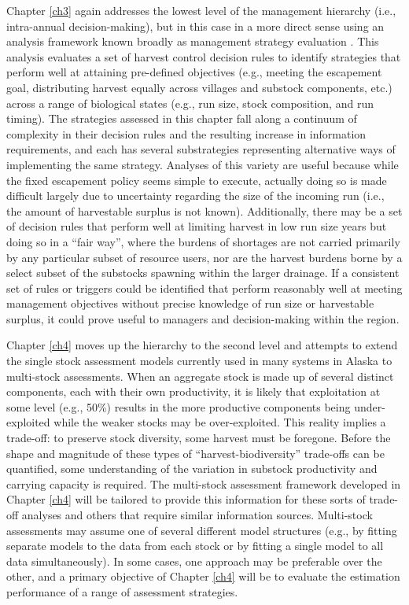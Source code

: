 \documentclass[12pt,]{book}
\theoremstyle{definition}
\theoremstyle{definition}
\theoremstyle{definition}
\theoremstyle{remark}
\begin{document}
Chapter \ref{ch3} again addresses the lowest level of the management
hierarchy (i.e., intra-annual decision-making), but in this case in a
more direct sense using an analysis framework known broadly as
management strategy evaluation \citep[MSE;
e.g.,][]{butterworth-2007, punt-etal-2014}. This analysis evaluates a
set of harvest control decision rules to identify strategies that
perform well at attaining pre-defined objectives (e.g., meeting the
escapement goal, distributing harvest equally across villages and
substock components, etc.) across a range of biological states (e.g.,
run size, stock composition, and run timing). The strategies assessed in
this chapter fall along a continuum of complexity in their decision
rules and the resulting increase in information requirements, and each
has several substrategies representing alternative ways of implementing
the same strategy. Analyses of this variety are useful because while the
fixed escapement policy seems simple to execute, actually doing so is
made difficult largely due to uncertainty regarding the size of the
incoming run (i.e., the amount of harvestable surplus is not known).
Additionally, there may be a set of decision rules that perform well at
limiting harvest in low run size years but doing so in a ``fair way'',
where the burdens of shortages are not carried primarily by any
particular subset of resource users, nor are the harvest burdens borne
by a select subset of the substocks spawning within the larger drainage.
If a consistent set of rules or triggers could be identified that
perform reasonably well at meeting management objectives without precise
knowledge of run size or harvestable surplus, it could prove useful to
managers and decision-making within the region.

Chapter \ref{ch4} moves up the hierarchy to the second level and
attempts to extend the single stock assessment models currently used in
many systems in Alaska to multi-stock assessments. When an aggregate
stock is made up of several distinct components, each with their own
productivity, it is likely that exploitation at some level (e.g., 50\%)
results in the more productive components being under-exploited while
the weaker stocks may be over-exploited. This reality implies a
trade-off: to preserve stock diversity, some harvest must be foregone.
Before the shape and magnitude of these types of
``harvest-biodiversity'' trade-offs can be quantified, some
understanding of the variation in substock productivity and carrying
capacity is required. The multi-stock assessment framework developed in
Chapter \ref{ch4} will be tailored to provide this information for these
sorts of trade-off analyses and others that require similar information
sources. Multi-stock assessments may assume one of several different
model structures (e.g., by fitting separate models to the data from each
stock or by fitting a single model to all data simultaneously). In some
cases, one approach may be preferable over the other, and a primary
objective of Chapter \ref{ch4} will be to evaluate the estimation
performance of a range of assessment strategies.
\end{document}
